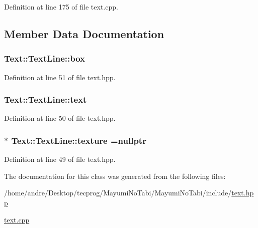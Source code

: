 Definition at line 175 of file text.\-cpp.



\subsection{Member Data Documentation}
\hypertarget{class_text_1_1_text_line_aa41f87701e516e3f519ff392f5f23b3b}{
\subsubsection[{box}]{ Text\-::\-Text\-Line\-::box}}\label{class_text_1_1_text_line_aa41f87701e516e3f519ff392f5f23b3b}


Definition at line 51 of file text.\-hpp.

\hypertarget{class_text_1_1_text_line_a54828e8f768d1523e6f23b073ab83a05}{
\subsubsection[{text}]{ Text\-::\-Text\-Line\-::text}}\label{class_text_1_1_text_line_a54828e8f768d1523e6f23b073ab83a05}


Definition at line 50 of file text.\-hpp.

\hypertarget{class_text_1_1_text_line_a3643b5ed5184bc0ee52d3675a0d4cbf7}{
\subsubsection[{texture}]{$\ast$ Text\-::\-Text\-Line\-::texture =nullptr}}\label{class_text_1_1_text_line_a3643b5ed5184bc0ee52d3675a0d4cbf7}


Definition at line 49 of file text.\-hpp.



The documentation for this class was generated from the following files\-:\begin{DoxyCompactItemize}
\item 
/home/andre/\-Desktop/tecprog/\-Mayumi\-No\-Tabi/\-Mayumi\-No\-Tabi/include/\hyperlink{text_8hpp}{text.\-hpp}\item 
\hyperlink{text_8cpp}{text.\-cpp}\end{DoxyCompactItemize}
